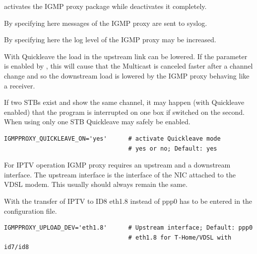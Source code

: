 \begin{description}


 activates the IGMP proxy package while 
deactivates it completely.


By specifying  here messages of the IGMP proxy are sent to syslog.


By specifying  here the log level of the IGMP proxy may be increased.


With Quickleave the load in the upstream link can be lowered. If the
parameter is enabled by , this will cause that the Multicast
is canceled faster after a channel change and so the downstream load
is lowered by the IGMP proxy behaving like a receiver.

If two STBs exist and show the same channel, it may happen  (with Quickleave
enabled) that the program is interrupted on one box if
switched on the second. When using only one STB Quickleave may safely
be enabled.

\begin{example}
\begin{verbatim}
IGMPPROXY_QUICKLEAVE_ON='yes'      # activate Quickleave mode
                                   # yes or no; Default: yes
\end{verbatim}
\end{example}


For IPTV operation IGMP proxy requires an upstream and a downstream interface.
The upstream interface is the interface of the NIC attached to the VDSL modem.
This usually should always remain the same.

With the transfer of IPTV to ID8 eth1.8 instead of ppp0 has to be entered
in the configuration file.

\begin{example}
\begin{verbatim}
IGMPPROXY_UPLOAD_DEV='eth1.8'      # Upstream interface; Default: ppp0
                                   # eth1.8 for T-Home/VDSL with id7/id8
\end{verbatim}
\end{example}


\end{description}
